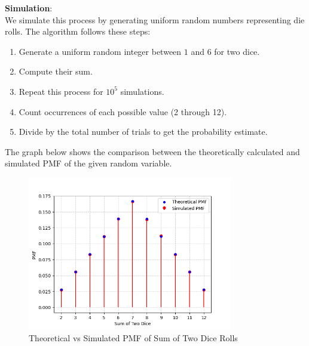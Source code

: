 \documentclass[journal]{IEEEtran}
\begin{document}
\textbf{Simulation}:\\
We simulate this process by generating uniform random numbers representing die rolls. The algorithm follows these steps:
\begin{enumerate}
    \item Generate a uniform random integer between $1$ and $6$ for two dice.
    \item Compute their sum.
    \item Repeat this process for $10^5$ simulations.
    \item Count occurrences of each possible value (2 through 12).
    \item Divide by the total number of trials to get the probability estimate.
\end{enumerate}

The graph below shows the comparison between the theoretically calculated and simulated PMF of the given random variable.

\begin{figure}[htbp]
  \centering
  \includegraphics[width=0.8\textwidth]{figs/Figure_1.png} %
  \caption{Theoretical vs Simulated PMF of Sum of Two Dice Rolls}
  \label{fig:pmf}
\end{figure}
\end{document}
